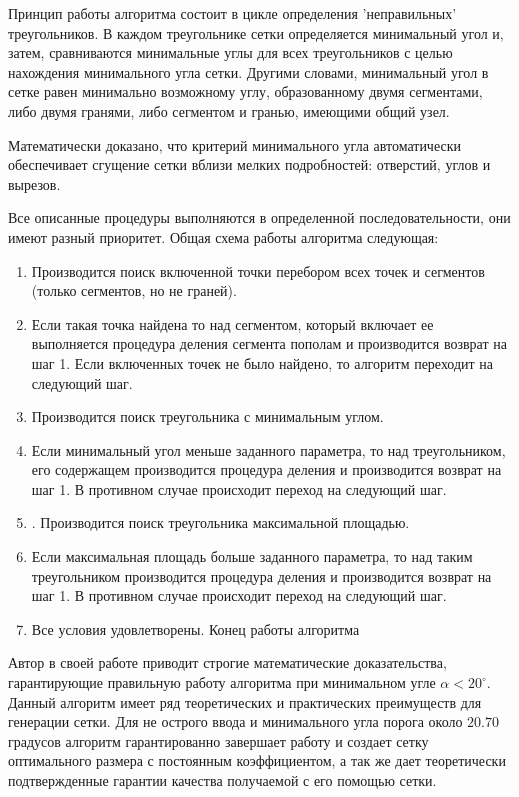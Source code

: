 \documentclass[14pt]{extreport}
\begin{document}
Принцип работы алгоритма состоит в цикле определения 'неправильных' треугольников. В каждом треугольнике сетки определяется минимальный угол и, затем, сравниваются минимальные углы для всех треугольников с целью нахождения минимального угла сетки. Другими словами, минимальный угол в сетке равен минимально возможному углу, образованному двумя сегментами, либо двумя гранями, либо сегментом и гранью, имеющими общий узел.

Математически доказано, что критерий минимального угла автоматически обеспечивает сгущение сетки вблизи мелких подробностей: отверстий, углов и вырезов. 

Все описанные процедуры выполняются в определенной последовательности, они имеют разный приоритет. Общая схема работы алгоритма следующая:

\begin{enumerate}

\item Производится поиск включенной точки перебором всех точек и сегментов (только сегментов, но не граней).

\item Если такая точка найдена то над сегментом, который включает ее выполняется процедура деления сегмента пополам и производится возврат на шаг 1. Если включенных точек не было найдено, то алгоритм переходит на следующий шаг.

\item Производится поиск треугольника с минимальным углом.

\item Если минимальный угол меньше заданного параметра, то над треугольником, его содержащем производится процедура деления и производится возврат на шаг 1. В противном случае происходит переход на следующий шаг.

\item. Производится поиск треугольника максимальной площадью.

\item Если максимальная площадь больше заданного параметра, то над таким треугольником производится процедура деления и производится возврат на шаг 1. В противном случае происходит переход на следующий шаг.

\item Все условия удовлетворены. Конец работы алгоритма

\end{enumerate}


Автор в своей работе приводит строгие математические доказательства, гарантирующие правильную работу алгоритма при минимальном угле $\alpha < 20^{\circ}$. Данный алгоритм имеет ряд теоретических и практических преимуществ для генерации сетки.  Для не острого ввода и минимального угла порога около $20.70$ градусов алгоритм гарантированно завершает работу и создает сетку оптимального размера с постоянным коэффициентом, а так же  дает теоретически подтвержденные гарантии качества получаемой с его помощью сетки.
\end{document}
